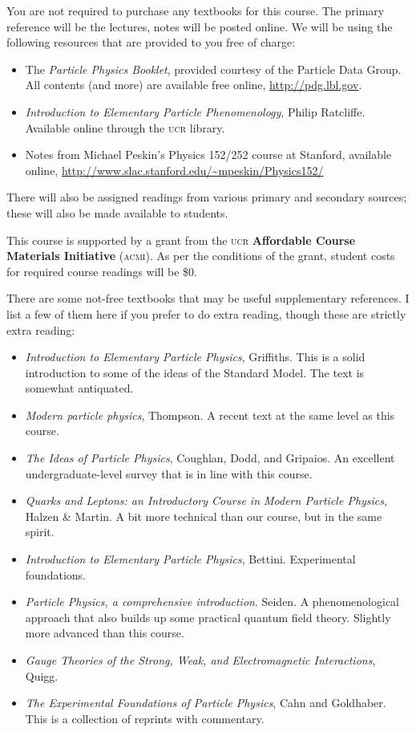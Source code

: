 \documentclass[12pt]{article}
\newcommand{\acro}[1]{\textsc{\MakeLowercase{#1}}}
\numberwithin{equation}{section}    %
\begin{document}
You are not required to purchase any textbooks for this course. The primary reference will be the lectures, notes will be posted online.  We will be using the following resources that are provided to you free of charge:
\begin{itemize}
	\item The \emph{Particle Physics Booklet}, provided courtesy of the Particle Data Group. All contents (and more) are available free online, \url{http://pdg.lbl.gov}.
	\item \emph{Introduction to Elementary Particle Phenomenology}, Philip Ratcliffe. Available online through the \acro{UCR} library.
	\item Notes from Michael Peskin's Physics 152/252 course at Stanford, available online, \url{http://www.slac.stanford.edu/~mpeskin/Physics152/}
\end{itemize}
There will also be assigned readings from various primary and secondary sources; these will also be made available to students. 

\begin{framed}
\noindent This course is supported by a grant from the \acro{UCR} \textbf{Affordable Course Materials Initiative} (\acro{ACMI}). As per the conditions of the grant, student costs for required course readings will be \$0. 	
\end{framed}

There are some not-free textbooks that may be useful supplementary references. I list a few of them here if you prefer to do extra reading, though these are strictly extra reading:
\begin{itemize}
	\item \emph{Introduction to Elementary Particle Physics}, Griffiths. This is a solid introduction to some of the ideas of the Standard Model. The text is somewhat antiquated.
	\item \emph{Modern particle physics}, Thompson. A recent text at the same level as this course.
	\item \emph{The Ideas of Particle Physics}, Coughlan, Dodd, and Gripaios. An excellent undergraduate-level survey that is in line with this course.
	\item \emph{Quarks and Leptons: an Introductory Course in Modern Particle Physics}, Halzen \& Martin. A bit more technical than our course, but in the same spirit.
	\item \emph{Introduction to Elementary Particle Physics}, Bettini. Experimental foundations.
	\item \emph{Particle Physics, a comprehensive introduction}. Seiden. A phenomenological approach that also builds up some practical quantum field theory. Slightly more advanced than this course.
	\item \emph{Gauge Theories of the Strong, Weak, and Electromagnetic Interactions}, Quigg. %
	\item \emph{The Experimental Foundations of Particle Physics}, Cahn and Goldhaber. This is a collection of reprints with commentary.
\end{itemize}
\end{document}
